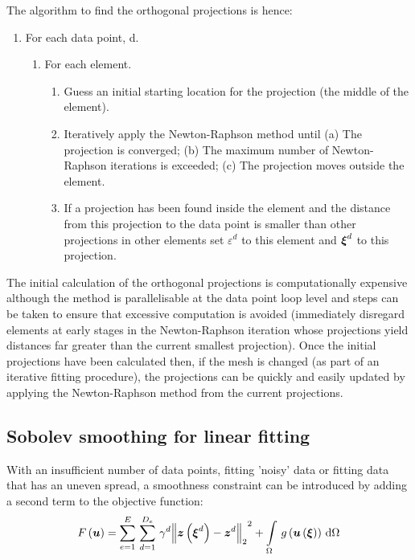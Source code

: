 The algorithm to find the orthogonal projections is hence:
\begin{enumerate}
\item For each data point, d.
  \begin{enumerate}
  \item For each element.
    \begin{enumerate}
    \item Guess an initial starting location for the projection (\eg the
      middle of the element).
    \item Iteratively apply the Newton-Raphson method until (a) The projection
      is converged; (b) The maximum number of Newton-Raphson iterations is
      exceeded; (c) The projection moves outside the element.
    \item If a projection has been found inside the element and the distance
      from this projection to the data point is smaller than other projections
      in other elements set $\varepsilon^{d}$ to this element and
      $\vect{\xi}^{d}$ to this projection.
    \end{enumerate}
  \end{enumerate}
\end{enumerate}

The initial calculation of the orthogonal projections is computationally
expensive although the method is parallelisable at the data point loop level
and steps can be taken to ensure that excessive
computation is avoided (\eg immediately disregard elements at early stages in
the Newton-Raphson iteration whose projections yield distances far greater
than the current smallest projection). Once the initial projections have been
calculated then, if the mesh is changed (as part of an iterative fitting
procedure), the projections can be quickly and easily updated by applying the
Newton-Raphson method from the current projections.

\subsection{Sobolev smoothing for linear fitting}
\label{sec:sobolevlinearfitting}

With an insufficient number of data points, fitting 'noisy' data or fitting
data that has an uneven spread, a smoothness constraint \cite{young:1989}
can be introduced by adding a second term to the objective function:
\begin{equation}
  \fnof{F}{\vectr{u}}=\gsum{e=1}{E}{\gsum{d=1}{D_{e}}{\gamma^{d}
    \norm{\fnof{\vectr{z}}{\vectr{\xi}^{d}}-\vectr{z}^{d}}^{2}}}+
  \gint{\Omega}{}{\fnof{g}{\fnof{\vectr{u}}{\vectr{\xi}}}}{\Omega}
  \label{eqn:soboleverrorfn}
\end{equation}


